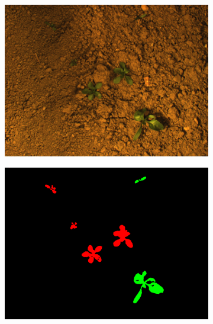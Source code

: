 \documentclass[letterpaper, 10 pt, conference]{ieeeconf}  %
\begin{document}
\begin{figure}
\begin{subfigure}[b]{0.49\linewidth}
   \end{subfigure}
        \begin{subfigure}[b]{0.49\linewidth}
    \includegraphics[width=\linewidth]{pics/stuttgart/images/masks_8mm_fromImages_frame479.png}
   		\caption{}
		\label{stuttgart_img}    		
    \vspace{1em}
   \end{subfigure}
        \begin{subfigure}[b]{0.49\linewidth}
    \includegraphics[width=\linewidth]{pics/stuttgart/annotations/masks_8mm_fromImages_frame479_GroundTruth_iMap.png}
   		\caption{}
		\label{stuttgart_lbl}    		
    \vspace{1em}
   \end{subfigure}

\end{figure}
\end{document}
